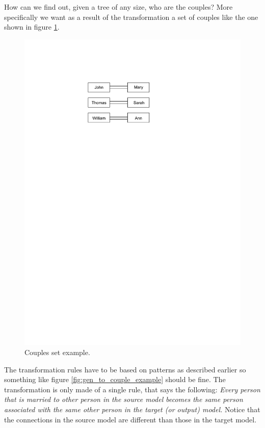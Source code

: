 How can we find out, given a tree of any size, who are the couples? More
specifically we want as a result of the transformation a set of couples like the
one shown in figure \ref{fig:couples_example}.

\begin{figure}[h]
\begin{center}
  \includegraphics[scale=1, trim=5.6cm 21.0cm 8.4cm 3.8cm,
  clip]{imgs/couples_example.pdf}
  \caption{Couples set example.}
  \label{fig:couples_example}
\end{center}
\end{figure}

The transformation rules have to be based on patterns as described earlier so
something like figure \ref{fig:gen_to_couple_example} should be fine. The
transformation is only made of a single rule, that says the following:
\emph{Every person that is married to other person in the source model becomes
the same person associated with the same other person in the target (or output) model.}
Notice that the connections in the source model are different
than those in the target model.

